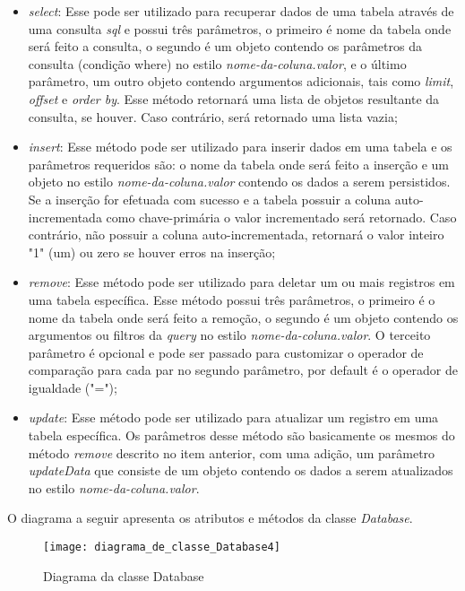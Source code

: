 \begin{itemize}
	\item \textit{select}: Esse pode ser utilizado para recuperar dados de uma tabela através de uma consulta \textit{sql} e possui três parâmetros, o primeiro é nome da tabela onde será feito a consulta, o segundo é um objeto contendo os parâmetros da consulta (condição where) no estilo  \textit{nome-da-coluna.valor}, e o último parâmetro, um outro objeto contendo argumentos adicionais, tais como \textit{limit}, \textit{offset} e \textit{order by}. Esse método retornará uma lista de objetos resultante da consulta, se houver. Caso contrário, será retornado uma lista vazia;

	\item \textit{insert}: Esse método pode ser utilizado para inserir dados em uma tabela e os parâmetros requeridos são: o nome da tabela onde será feito a inserção e um objeto no estilo \textit{nome-da-coluna.valor} contendo os dados a serem persistidos. Se a inserção for efetuada com sucesso e a tabela possuir a coluna auto-incrementada como chave-primária o valor incrementado será retornado. Caso contrário, não possuir a coluna auto-incrementada, retornará o valor inteiro "1" (um) ou zero se houver erros na inserção;

	\item \textit{remove}: Esse método pode ser utilizado para deletar um ou mais registros em uma tabela específica. Esse método possui três parâmetros, o primeiro é o nome da tabela onde será feito a remoção, o segundo é um objeto contendo os argumentos ou filtros da \textit{query} no estilo \textit{nome-da-coluna.valor}. O terceito parâmetro é opcional e pode ser passado para customizar o operador de comparação para cada par no segundo parâmetro, por default é o operador de igualdade ("=");

	\item \textit{update}: Esse método pode ser utilizado para atualizar um registro em uma tabela específica. Os parâmetros desse método são basicamente os mesmos do método \textit{remove} descrito no item anterior, com uma adição, um parâmetro \textit{updateData} que consiste de um objeto contendo os dados a serem atualizados no estilo \textit{nome-da-coluna.valor}.
\end{itemize}

O diagrama a seguir apresenta os atributos e métodos da classe \textit{Database}.
\begin{figure}[h]
	\texttt{[image: diagrama\_de\_classe\_Database4]}
	\centering
	\caption{Diagrama da classe Database}
\end{figure}


